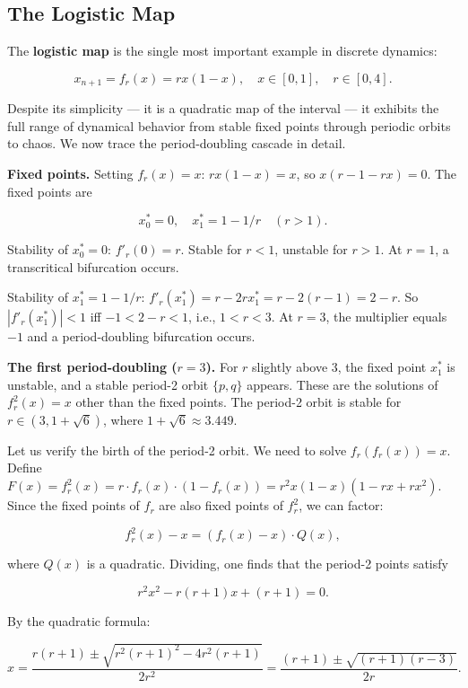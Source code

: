 \subsection{The Logistic Map}\label{sec:5.5.2}

The \textbf{logistic map} is the single most important example in discrete dynamics:

\begin{equation}\label{eq:5.9}\tag{5.9}
x_{n+1} = f_r(x) = rx(1 - x), \quad x \in [0, 1], \quad r \in [0, 4].
\end{equation}

Despite its simplicity --- it is a quadratic map of the interval --- it exhibits the full range of dynamical behavior from stable fixed points through periodic orbits to chaos. We now trace the period-doubling cascade in detail.

\textbf{Fixed points.} Setting $f_r(x) = x$: $rx(1-x) = x$, so $x(r - 1 - rx) = 0$. The fixed points are

\[
x_0^* = 0, \quad x_1^* = 1 - 1/r \quad (r > 1).
\]

Stability of $x_0^* = 0$: $f'_r(0) = r$. Stable for $r < 1$, unstable for $r > 1$. At $r = 1$, a transcritical bifurcation occurs.

Stability of $x_1^* = 1 - 1/r$: $f'_r(x_1^*) = r - 2r x_1^* = r - 2(r-1) = 2 - r$. So $|f'_r(x_1^*)| < 1$ iff $-1 < 2 - r < 1$, i.e., $1 < r < 3$. At $r = 3$, the multiplier equals $-1$ and a period-doubling bifurcation occurs.

\textbf{The first period-doubling ($r = 3$).} For $r$ slightly above 3, the fixed point $x_1^*$ is unstable, and a stable period-2 orbit $\{p, q\}$ appears. These are the solutions of $f_r^2(x) = x$ other than the fixed points. The period-2 orbit is stable for $r \in (3, 1 + \sqrt{6})$, where $1 + \sqrt{6} \approx 3.449$.

Let us verify the birth of the period-2 orbit. We need to solve $f_r(f_r(x)) = x$. Define $F(x) = f_r^2(x) = r \cdot f_r(x) \cdot (1 - f_r(x)) = r^2 x(1-x)(1 - rx + rx^2)$. Since the fixed points of $f_r$ are also fixed points of $f_r^2$, we can factor:

\[
f_r^2(x) - x = (f_r(x) - x)\cdot Q(x),
\]

where $Q(x)$ is a quadratic. Dividing, one finds that the period-2 points satisfy

\[
r^2 x^2 - r(r+1)x + (r+1) = 0.
\]

By the quadratic formula:

\[
x = \frac{r(r+1) \pm \sqrt{r^2(r+1)^2 - 4r^2(r+1)}}{2r^2} = \frac{(r+1) \pm \sqrt{(r+1)(r-3)}}{2r}.
\]

